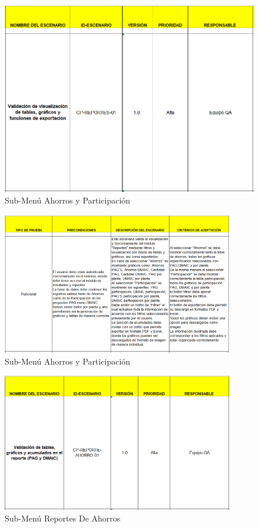 \documentclass[12pt,letterpaper,spanish, xcolor=table]{report}
\numberwithin{figure}{subsection}
\begin{document}
	
	\begin{figure}[H]
		\centering
		\includegraphics[width=1.0\textwidth]
		{Imagenes/CenterPoint/EParticipacion.png}
		\caption{Sub-Menú Ahorros y Participación}\label{a3}
	\end{figure}
	
	\begin{figure}[H]
		\centering
		\includegraphics[width=0.9\textwidth]
		{Imagenes/CenterPoint/EParticipacion2.png}
		\caption{Sub-Menú Ahorros y Participación}\label{a3}
	\end{figure}
	
	\begin{figure}[H]
		\centering
		\includegraphics[width=0.9\textwidth]
		{Imagenes/CenterPoint/EReportesA.png}
		\caption{Sub-Menú Reportes De Ahorros}\label{a3}
	\end{figure}
	
\end{document}
